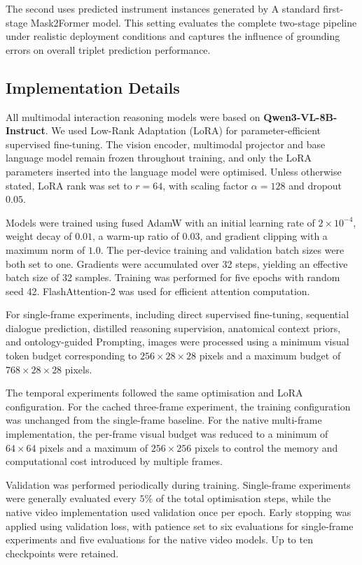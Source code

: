 \documentclass[11pt]{article}
\begin{document}
The second uses predicted instrument instances generated by A standard first-stage Mask2Former model. This setting evaluates the complete two-stage pipeline under realistic deployment conditions and captures the influence of grounding errors on overall triplet prediction performance.

\subsection{Implementation Details}
All multimodal interaction reasoning models were based on \textbf{Qwen3-VL-8B-Instruct}. We used Low-Rank Adaptation (LoRA) for parameter-efficient supervised fine-tuning. The vision encoder, multimodal projector and base language model remain frozen throughout training, and only the LoRA parameters inserted into the language model were optimised. Unless otherwise stated, LoRA rank was set to $r=64$, with scaling factor $\alpha=128$ and dropout $0.05$.

Models were trained using fused AdamW with an initial learning rate of $2\times10^{-4}$, weight decay of $0.01$, a warm-up ratio of $0.03$, and gradient clipping with a maximum norm of $1.0$. The per-device training and validation batch sizes were both set to one. Gradients were accumulated over 32 steps, yielding an effective batch size of 32 samples. Training was performed for five epochs with random seed 42. FlashAttention-2 was used for efficient attention computation.

For single-frame experiments, including direct supervised fine-tuning, sequential dialogue prediction, distilled reasoning supervision, anatomical context priors, and ontology-guided Prompting, images were processed using a minimum visual token budget corresponding to $256\times28\times28$ pixels and a maximum budget of $768\times28\times28$ pixels.

The temporal experiments followed the same optimisation and LoRA configuration. For the cached three-frame experiment, the training configuration was unchanged from the single-frame baseline. For the native multi-frame implementation, the per-frame visual budget was reduced to a minimum of $64\times64$ pixels and a maximum of $256\times256$ pixels to control the memory and computational cost introduced by multiple frames.

Validation was performed periodically during training. Single-frame experiments were generally evaluated every $5\%$ of the total optimisation steps, while the native video implementation used validation once per epoch. Early stopping was applied using validation loss, with patience set to six evaluations for single-frame experiments and five evaluations for the native video models. Up to ten checkpoints were retained.
\end{document}
